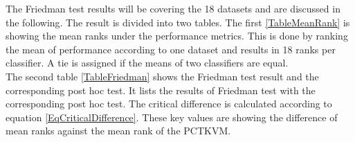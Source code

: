 \begin{table}[b]
	\centering
	\caption[Result of Friedman Test with Bonferroni-Dun as Post-Hoc Test]{The result of the Friedman test with Bonferroni-Dunn as post-hoc Test to compare classifiers over multiple Datasets. The first column shows the Friedman value, the second the critical difference which is subtracted from the mean ranks. The classifier columns are showing the result of the post-hoc test. Bold differences are significant.\label{TableFriedman}}
\end{table}
The Friedman test results will be covering the 18 datasets and are discussed in the following.
The result is divided into two tables.
The first \ref{TableMeanRank} is showing the mean ranks under the performance metrics.
This is done by ranking the mean of performance according to one dataset and results in 18 ranks per classifier.
A tie is assigned if the means of two classifiers are equal.\\
The second table \ref{TableFriedman} shows the Friedman test result and the corresponding post hoc test. 
It lists the results of Friedman test with the corresponding post hoc test. The critical difference is calculated according to equation \eqref{EqCriticalDifference}.
These key values are showing the difference of mean ranks against the mean rank of the \acs{PCTKVM}.\\

